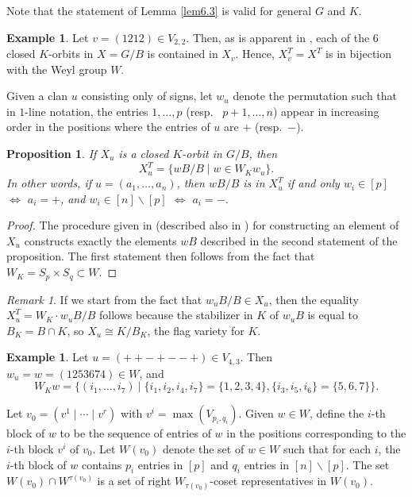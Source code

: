 \documentclass[11pt,letterpaper,reqno]{amsart}
\numberwithin{equation}{section}
\theoremstyle{plain}
\newtheorem{proposition}[theorem]{Proposition}
\theoremstyle{definition}
\newtheorem{example}[theorem]{Example}
\theoremstyle{remark}
\newtheorem{remark}[theorem]{Remark}
\begin{document}
Note that the statement of Lemma \ref{lem6.3} is valid for general $G$ and $K$.

\begin{example}
Let $v=(1212) \in V_{2,2}$. Then, as is apparent in \cite[Figure 2]{Wys}, each of the $6$ closed $K$-orbits in $X = G/B$ is contained in $X_v$.
Hence, $X_v^T = X^T$ is in bijection with the Weyl group $W$.  
\end{example}

Given a clan $u$ consisting only of signs, let $w_u$ denote the permutation such that in $1$-line notation, the entries $1, \ldots, p$ (resp.~ $p+1, \ldots, n$) appear in increasing order
in the positions where the entries of $u$ are $+$ (resp.~$-$).

\begin{proposition} \label{p:fixedpoint-closed}
If $X_u$ is a closed $K$-orbit in $G/B$, then
$$
 X_u^T = \{ w B/B \mid w \in W_K w_u \}.
$$ 
In other words, if $u = (a_1, \ldots, a_n)$, then 
$wB/B$ is in $X_u^T$ if and only 
$w_i \in [p]$ $\Leftrightarrow$ $a_i = +$, and $w_i \in [n] \smallsetminus [p]$
$\Leftrightarrow$ $a_i = -$.  
\end{proposition}

\begin{proof}
The procedure given in \cite{Yam} (described also in \cite{Wys}) for constructing an element of $X_u$ constructs exactly the elements
$wB$ described in the second statement of the proposition.  The first statement then follows from the fact that $W_K = S_p \times S_q \subset W$.
\end{proof}

\begin{remark}
If we start from the fact that $w_u B/B \in X_u$, then the equality $X_u^T = W_K \cdot w_uB/B$  follows because
the stabilizer
in $K$ of $w_u B$ is equal to $B_K = B \cap K$, so  $X_u \cong K/B_K$, the flag variety for $K$.
\end{remark}

\begin{example}
Let $u=(+ + - + - -+)\in V_{4,3}$. Then $w_u = w=(1253674)\in W$, and
$$
W_K w  = \{(i_1,\ldots,i_7)\:|\;\{i_1,i_2,i_4,i_7\}=\{1,2,3,4\},\{i_3,i_5,i_6\}=\{5,6,7\}\}.
$$
\end{example}




 Let $v_0 = (v^1 \mid \cdots \mid v^r)$ with $v^i = \max(V_{p_i, q_i})$.  
Given $w \in W$, define the $i$-th
 block of $w$ to be the sequence of entries of $w$ in the positions corresponding to the $i$-th block $v^i$ of $v_0$.
Let $W(v_0)$ denote the set of $w \in W$ such that for each $i$,
the $i$-th block of $w$ contains $p_i$ entries in $[p]$ and $q_i$ entries in $[n] \smallsetminus [p]$.
The set $W(v_0) \cap W^{\tau(v_0)}$ is a set of right $W_{\tau(v_0)}$-coset representatives in $W(v_0)$.
\end{document}
